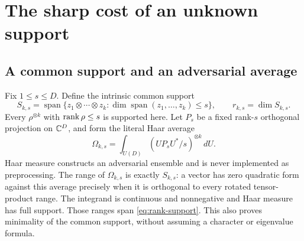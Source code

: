 \section{The sharp cost of an unknown support}\label{sec:support}

\subsection{A common support and an adversarial average}
Fix $1\le s\le D$. Define the intrinsic common support
\begin{equation}\label{eq:rank-support}
 S_{k,s}=\operatorname{span}\{z_1\otimes\cdots\otimes z_k:
 \dim\operatorname{span}(z_1,\ldots,z_k)\le s\},\qquad r_{k,s}=\dim S_{k,s}.
\end{equation}
Every $\rho^{\otimes k}$ with $\operatorname{rank}\rho\le s$ is supported here. Let $P_s$ be a fixed rank-$s$ orthogonal projection on $\mathbb C^D$, and form the literal Haar average
\begin{equation}\label{eq:haar-average}
 \Omega_{k,s}=\int_{U(D)}(UP_sU^*/s)^{\otimes k}\,dU.
\end{equation}
Haar measure constructs an adversarial ensemble and is never implemented as preprocessing. The range of $\Omega_{k,s}$ is exactly $S_{k,s}$: a vector has zero quadratic form against this average precisely when it is orthogonal to every rotated tensor-product range. The integrand is continuous and nonnegative and Haar measure has full support. Those ranges span \eqref{eq:rank-support}. This also proves minimality of the common support, without assuming a character or eigenvalue formula.

